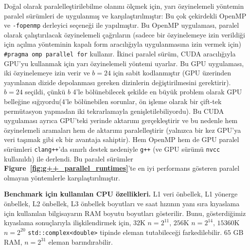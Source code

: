 \documentclass[10pt]{article}
\begin{document}
Do\u{g}al olarak paralelle\c{s}tirilebilme olan{\i}n{\i} \"{o}l\c{c}mek i\c{c}in, yar{\i} \"{o}zyinelemeli 
y\"{o}ntemin paralel s\"{u}r\"{u}mleri de uygulanm{\i}\c{s} ve kar\c{s}{\i}la\c{s}t{\i}r{\i}lm{\i}\c{s}t{\i}r: Bu \c{c}ok 
\c{c}ekirdekli OpenMP ve {\tt -fopenmp} derleyici se\c{c}ene\u{g}i ile yap{\i}lm{\i}\c{s}t{\i}r. 
Bu OpenMP uygulamas{\i}, paralel olarak \c{c}al{\i}\c{s}t{\i}r{\i}lacak \"{o}zyinelemeli 
\c{c}a\u{g}r{\i}lar{\i}n (sadece bir \"{o}zyinelemeye izin verildi\u{g}i i\c{c}in a\c{c}{\i}lma 
y\"{o}nteminin kapal{\i} form arac{\i}l{\i}\u{g}{\i}yla uygulanmas{\i}na izin vermek i\c{c}in) 
{\tt \#pragma omp parallel for} kullan{\i}r. \.{I}kinci paralel s\"{u}r\"{u}m, CUDA 
arac{\i}l{\i}\u{g}{\i}yla GPU'yu kullanmak i\c{c}in yar{\i} \"{o}zyinelemeli y\"{o}ntemi uyarlar. 
Bu GPU uygulamas{\i}, iki \"{o}zyinelemeye izin verir ve $b=24$ i\c{c}in sabit 
kodlanm{\i}\c{s}t{\i}r (GPU \"{u}zerinden yay{\i}nlanan dizide depolanmas{\i} gereken 
dizinlerin de\u{g}i\c{s}tirilmesini gerektirir). $b=24$ se\c{c}ildi, \c{c}\"{u}nk\"{u} 
$b$ 4'le b\"{o}l\"{u}nebilecek \c{s}ekilde en b\"{u}y\"{u}k problem olarak GPU belle\u{g}ine 
s{\i}\u{g}{\i}yordu(4'le b\"{o}l\"{u}nebilen sorunlar, \"{o}n i\c{s}leme olarak bir 
\c{c}ift-tek perm\"{u}tasyon yapmadan iki tekrarlamayla geni\c{s}letilebiliyordu). 
Bu CUDA uygulamas{\i} ayr{\i}ca GPU'teki yerinde aktar{\i}m{\i} ger\c{c}ekle\c{s}tirir\cite{harris:cuda} 
ve bu nedenle hem \"{o}zyinelemeli aramalar{\i} hem de aktar{\i}m{\i} paralelle\c{s}tirir
(yaln{\i}zca bir kez GPU'ya veri ta\c{s}{\i}mak gibi ek bir avantaja sahiptir). 
Hem OpenMP hem de GPU paralel s\"{u}r\"{u}mleri {\tt clang++}'da s{\i}n{\i}rl{\i} destek 
nedeniyle {\tt g++} (ve GPU s\"{u}r\"{u}m\"{u} {\tt nvcc} kullan{\i}ld{\i}) ile derlendi. 
Bu paralel s\"{u}r\"{u}mler {\bf Figure~\ref{fig:g++_parallel_runtimes}}'te en 
iyi performans g\"{o}steren paralel olmayan y\"{o}ntemlerle kar\c{s}{\i}la\c{s}t{\i}r{\i}lm{\i}\c{s}t{\i}r.

\begin{table}[ht!]
  \centering
  
\caption{ {\bf Benchmark i\c{c}in kullan{\i}lan CPU \"{o}zellikleri.} 
L1 veri \"{o}nbellek, L1 y\"{o}nerge \"{o}nbellek, L2 \"{o}nbellek, L3 \"{o}nbellek boyutlar{\i} 
ve saat h{\i}z{\i}n{\i}n yan{\i} s{\i}ra k{\i}yaslama i\c{c}in kullan{\i}lan bilgisayar{\i}n RAM 
boyutu boyutlar{\i} g\"{o}sterilir. Bunu, g\"{o}sterdi\u{g}imiz k{\i}yaslama sonu\c{c}lar{\i}yla 
ili\c{s}kilendirmek i\c{c}in, $32$K $n=2^{11}$, $256$K $n=2^{14}$, 
$15360$K $n=2^{20}$ {\tt std::complex<double>} tipinde
eleman tutabilece\u{g}i farkedilebilir. $65$ GB RAM, $n=2^{31}$ eleman bar{\i}nd{\i}rabilir.
  \label{table:cpu_spec}
}
\end{table}
\end{document}
